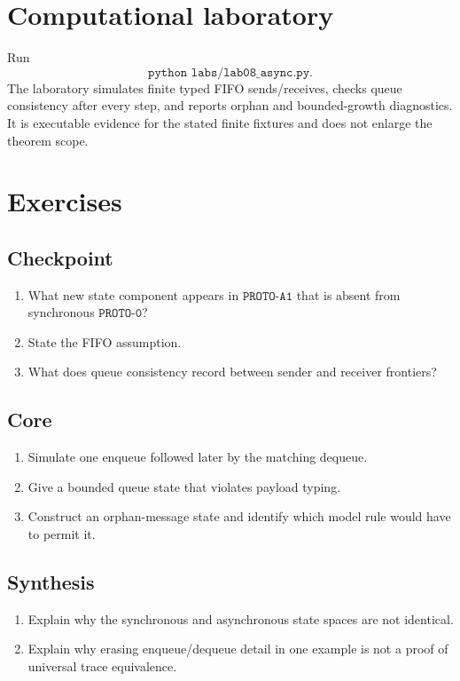 

\section{Computational laboratory}
\begin{labbox}
Run
\[
  \texttt{python labs/lab08_async.py}.
\]
The laboratory simulates finite typed FIFO sends/receives, checks queue consistency after every step, and reports orphan and bounded-growth diagnostics. It is executable evidence for the stated finite fixtures and does not enlarge the theorem scope.
\end{labbox}

\section{Exercises}
\subsection*{Checkpoint}
\begin{enumerate}[label=\textbf{8.\arabic*},start=1]
\item What new state component appears in $\texttt{PROTO-A1}$ that is absent from synchronous $\texttt{PROTO-0}$?
\item State the FIFO assumption.
\item What does queue consistency record between sender and receiver frontiers?
\end{enumerate}
\subsection*{Core}
\begin{enumerate}[label=\textbf{8.\arabic*},start=4]
\item Simulate one enqueue followed later by the matching dequeue.
\item Give a bounded queue state that violates payload typing.
\item Construct an orphan-message state and identify which model rule would have to permit it.
\end{enumerate}
\subsection*{Synthesis}
\begin{enumerate}[label=\textbf{8.\arabic*},start=7]
\item Explain why the synchronous and asynchronous state spaces are not identical.
\item Explain why erasing enqueue/dequeue detail in one example is not a proof of universal trace equivalence.
\end{enumerate}
